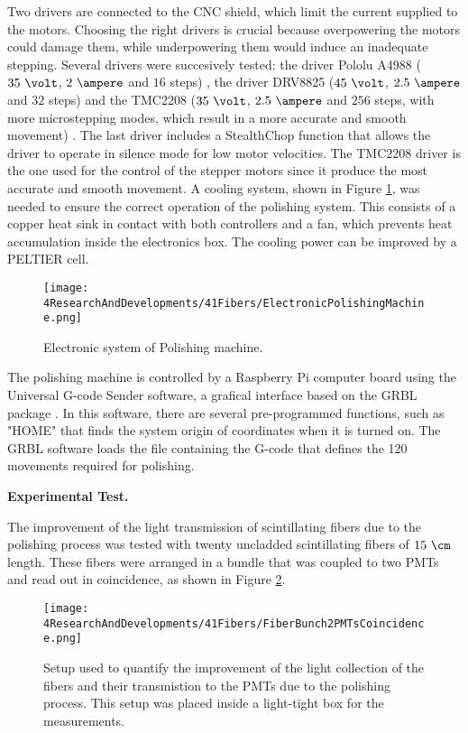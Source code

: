 \begin{enumerate}
Two drivers are connected to the CNC shield, which limit the current supplied to the motors. Choosing the right drivers is crucial because overpowering the motors could damage them, while underpowering them would induce an inadequate stepping. Several drivers were succesively tested: the driver Pololu A4988 ($35~\volt$, $2~\ampere$ and $16$ steps) \cite{A4988Driver}, the driver DRV8825 ($45~\volt$, $2.5~\ampere$ and $32$ steps) \cite{DRV8825Driver} and the TMC2208 ($35~\volt$, $2.5~\ampere$ and $256$ steps, with more microstepping modes, which result in a more accurate and smooth movement) \cite{TMC2208Driver}. The last driver includes a StealthChop function that allows the driver to operate in silence mode for low motor velocities. The TMC2208 driver is the one used for the control of the stepper motors since it produce the most accurate and smooth movement. A cooling system, shown in Figure \ref{fig:ElectronicSystemPolishingMachine}, was needed to ensure the correct operation of the polishing system. This consists of a copper heat sink in contact with both controllers and a fan, which prevents heat accumulation inside the electronics box. The cooling power can be improved by a PELTIER cell.

\begin{figure}[h]
\centering
\texttt{[image: 4ResearchAndDevelopments/41Fibers/ElectronicPolishingMachine.png]}
\caption{Electronic system of Polishing machine.\label{fig:ElectronicSystemPolishingMachine}}
\end{figure}
\end{enumerate}

The polishing machine is controlled by a Raspberry Pi computer board \cite{RaspberryPi} using the Universal G-code Sender software, a grafical interface based on the GRBL package \cite{GRBLDocumentation}. In this software, there are several pre-programmed functions, such as "HOME" that finds the system origin of coordinates when it is turned on. The GRBL software loads the file containing the G-code that defines the 120 movements required for polishing.

\textbf{Experimental Test.}

The improvement of the light transmission of scintillating fibers due to the polishing process was tested with twenty uncladded scintillating fibers of $15~\cm$ length. These fibers were arranged in a bundle that was coupled to two PMTs and read out in coincidence, as shown in Figure \ref{fig:BunchWith2PMTsCoincidence}.

\begin{figure}[]
\centering
\texttt{[image: 4ResearchAndDevelopments/41Fibers/FiberBunch2PMTsCoincidence.png]}
\caption{Setup used to quantify the improvement of the light collection of the fibers and their transmistion to the PMTs due to the polishing process. This setup was placed inside a light-tight box for the measurements.\label{fig:BunchWith2PMTsCoincidence}}
\end{figure}

